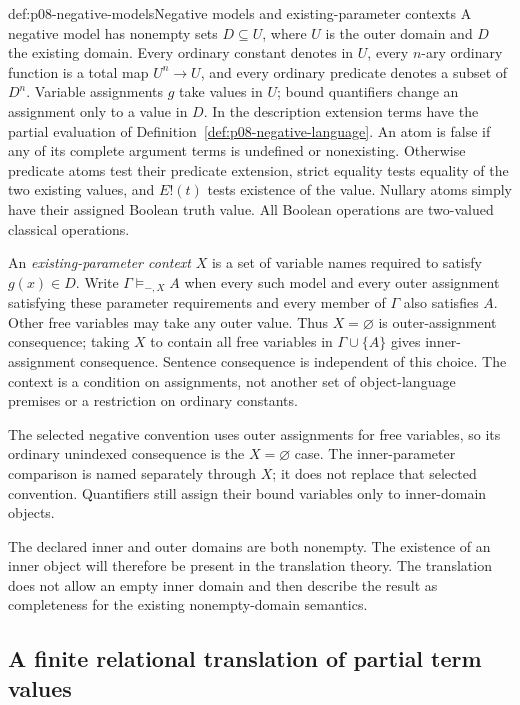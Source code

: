 \begin{hbdefinition}{def:p08-negative-models}{Negative models and existing-parameter contexts}
A negative model has nonempty sets \(D\subseteq U\), where \(U\) is the
outer domain and \(D\) the existing domain.  Every ordinary constant denotes
in \(U\), every \(n\)-ary ordinary function is a total map \(U^n\to U\),
and every ordinary predicate denotes a subset of \(D^n\).  Variable
assignments \(g\) take values in \(U\); bound quantifiers change an
assignment only to a value in \(D\).  In the description extension terms
have the partial evaluation of Definition~\ref{def:p08-negative-language}.
An atom is false if any of its complete argument terms is undefined or
nonexisting.  Otherwise predicate atoms test their predicate extension,
strict equality tests equality of the two existing values, and \(E!(t)\)
tests existence of the value.  Nullary atoms simply have their assigned
Boolean truth value.  All Boolean operations are two-valued classical
operations.

An \emph{existing-parameter context} \(X\) is a set of variable names
required to satisfy \(g(x)\in D\).  Write
\(\Gamma\models_{-,X}A\) when every such model and every outer assignment
satisfying these parameter requirements and every member of \(\Gamma\)
also satisfies \(A\).  Other free variables may take any outer value.
Thus \(X=\varnothing\) is outer-assignment consequence; taking
\(X\) to contain all free variables in \(\Gamma\cup\{A\}\) gives
inner-assignment consequence.  Sentence consequence is independent of this
choice.  The context is a condition on assignments, not another set of
object-language premises or a restriction on ordinary constants.
\end{hbdefinition}

The selected negative convention uses outer assignments for free variables,
so its ordinary unindexed consequence is the \(X=\varnothing\) case.
The inner-parameter comparison is named separately through \(X\); it does
not replace that selected convention.  Quantifiers still assign their bound
variables only to inner-domain objects.

The declared inner and outer domains are both nonempty.  The existence of an
inner object will therefore be present in the translation theory.  The
translation does not allow an empty inner domain and then describe the result
as completeness for the existing nonempty-domain semantics.

\subsection{A finite relational translation of partial term values}

